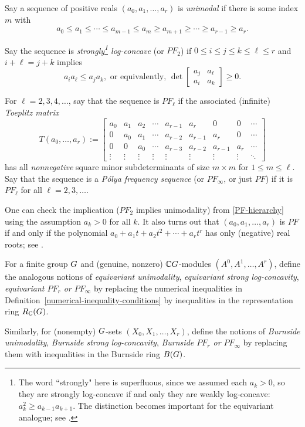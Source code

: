 \begin{defn}\rm
\label{numerical-inequality-conditions}
    Say a sequence of positive reals $(a_0,a_1,\ldots,a_r)$ is {\it unimodal} if there is some index $m$ with 
    $$
    a_0 \leq a_1 \leq \cdots \leq a_{m-1} \leq a_m \geq a_{m+1} \geq \cdots \geq a_{r-1} \geq a_r.
    $$
    
    Say the sequence is {\it strongly\footnote{The word ``strongly" here is superfluous, since we assumed each $a_k >0$, so they are strongly log-concave if and only they are weakly log-concave:  $a_k^2 \geq a_{k-1} a_{k+1}$.  The distinction becomes important for the equivariant analogue; see \cite[\S 2]{MMPR}.} log-concave} (or {\it $PF_2$}) if  $0 \leq i\leq j \leq k \leq \ell\leq r$ and $i+\ell=j+k$ implies
    $$
    a_i a_\ell \leq a_j a_k, \text{ or equivalently,  }
    \det\left[ \begin{matrix} a_j & a_\ell \\ a_i & a_k \end{matrix}\right] \geq 0.
    $$
    
    For $\ell=2,3,4,\ldots$, say that the sequence is $PF_\ell$ if the associated (infinite) {\it Toeplitz matrix} 
    $$
    T(a_0,\ldots,a_r):=
    \left[
    \begin{matrix}
        a_0 & a_1& a_2& \cdots & a_{r-1} & a_r     & 0   & 0 & \cdots  \\
        0   & a_0 & a_1 & \cdots & a_{r-2} & a_{r-1} & a_{r} & 0 &\cdots \\
        0   & 0   & a_0 & \cdots & a_{r-3} & a_{r-2} & a_{r-1} & a_{r}& \cdots \\
        \vdots & \vdots & \vdots & \vdots & \vdots & \vdots & \vdots & \vdots & \ddots 
    \end{matrix}
    \right]
    $$
    has all {\it nonnegative} square minor subdeterminants of size 
    $m \times m$ for $1\leq m  \leq \ell$.
    Say that the sequence is a {\it P\'olya frequency sequence} (or {\it $PF_\infty$}, or just {\it $PF$}) if it is $PF_\ell$ for all $\ell=2,3,\ldots$.
\end{defn}
\noindent
One can check the implication ($PF_2$ implies
unimodality) from \eqref{PF-hierarchy} using the assumption 
$a_k >0$ for all $k$.
It also turns out that $(a_0,a_1,\ldots,a_r)$ is $PF$ if and only if the polynomial $a_0 + a_1 t+a_2 t^2+ \cdots+ a_r t^r$ has only (negative) real roots; see \cite[\S 2.2, 4.5]{Brenti}.

\begin{defn} \rm
For a finite group $G$ and (genuine, nonzero) $\mathbb{C} G$-modules $(A^0,A^1,\ldots,A^r)$, define the analogous
notions of {\it equivariant unimodality}, {\it equivariant strong log-concavity}, {\it equivariant $PF_r$ or $PF_\infty$} by replacing the numerical inequalities in 
Definition~\ref{numerical-inequality-conditions} by
inequalities in the representation ring $R_{\mathbb{C}}(G)$. 

Similarly, for (nonempty) $G$-sets
$(X_0,X_1,\ldots,X_r)$, define the notions of  {\it Burnside unimodality}, {\it Burnside strong log-concavity}, {\it Burnside $PF_r$ or $PF_\infty$} by replacing them with  inequalities in the Burnside ring $B(G)$. 
\end{defn}

